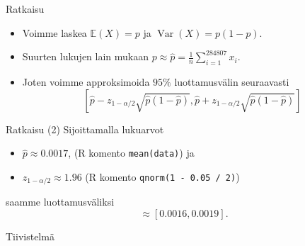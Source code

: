 \documentclass{beamer}
\DeclareMathOperator{\var}{Var}
\begin{document}

\begin{frame}{Ratkaisu}
  \begin{itemize}
    \item Voimme laskea $\mathbb{E}\left(X\right) = p$ ja $\var\left(X\right) =
    p(1-p)$.
    \item Suurten lukujen lain mukaan $p \approx \hat p =
    \frac{1}{n}\sum_{i=1}^{284807} x_i$.
    \item Joten voimme approksimoida $95\%$ luottamusvälin seuraavasti
    \begin{equation*}
      \left[\hat p - z_{1 - \alpha/2}\sqrt{\hat p(1-\hat p)},
      \hat p + z_{1 - \alpha/2}\sqrt{\hat p(1-\hat p)}\right]
    \end{equation*}
  \end{itemize}
\end{frame}


\begin{frame}{Ratkaisu (2)}
  Sijoittamalla lukuarvot
  \begin{itemize}
    \item $\hat p\approx 0.0017$, (\textsf{R} komento \texttt{mean(data)}) ja
    \item $z_{1 - \alpha / 2} \approx 1.96$ (\textsf{R} komento \texttt{qnorm(1 - 0.05 / 2)})
  \end{itemize}
  saamme luottamusväliksi
  \begin{equation*}
    \approx \left[0.0016, 0.0019\right].
  \end{equation*}
\end{frame}

\begin{frame}{Tiivistelmä}
  
\end{frame}

\end{document}
